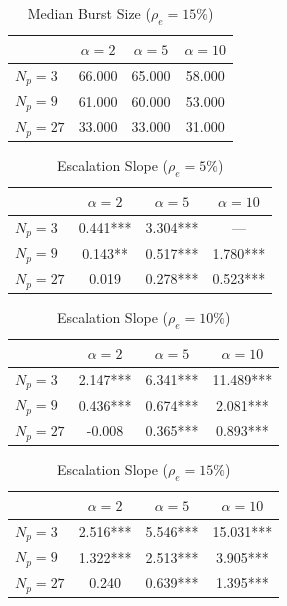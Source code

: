 \begin{table}[htbp]
\centering
\begin{tabular}{lccc}
\toprule
 & $\alpha=2$ & $\alpha=5$ & $\alpha=10$ \\
\midrule
$N_p=3$ & 66.000 & 65.000 & 58.000 \\
$N_p=9$ & 61.000 & 60.000 & 53.000 \\
$N_p=27$ & 33.000 & 33.000 & 31.000 \\
\bottomrule
\end{tabular}
\caption{Median Burst Size ($\rho_e=15\%$)}
\label{tab:exp2_burst_size_median_rho15}
\end{table}


\begin{table}[htbp]
\centering
\begin{tabular}{lccc}
\toprule
 & $\alpha=2$ & $\alpha=5$ & $\alpha=10$ \\
\midrule
$N_p=3$ & 0.441*** & 3.304*** & --- \\
$N_p=9$ & 0.143** & 0.517*** & 1.780*** \\
$N_p=27$ & 0.019 & 0.278*** & 0.523*** \\
\bottomrule
\end{tabular}
\caption{Escalation Slope ($\rho_e=5\%$)}
\label{tab:exp2_escalation_slope_rho5}
\end{table}


\begin{table}[htbp]
\centering
\begin{tabular}{lccc}
\toprule
 & $\alpha=2$ & $\alpha=5$ & $\alpha=10$ \\
\midrule
$N_p=3$ & 2.147*** & 6.341*** & 11.489*** \\
$N_p=9$ & 0.436*** & 0.674*** & 2.081*** \\
$N_p=27$ & -0.008 & 0.365*** & 0.893*** \\
\bottomrule
\end{tabular}
\caption{Escalation Slope ($\rho_e=10\%$)}
\label{tab:exp2_escalation_slope_rho10}
\end{table}


\begin{table}[htbp]
\centering
\begin{tabular}{lccc}
\toprule
 & $\alpha=2$ & $\alpha=5$ & $\alpha=10$ \\
\midrule
$N_p=3$ & 2.516*** & 5.546*** & 15.031*** \\
$N_p=9$ & 1.322*** & 2.513*** & 3.905*** \\
$N_p=27$ & 0.240 & 0.639*** & 1.395*** \\
\bottomrule
\end{tabular}
\caption{Escalation Slope ($\rho_e=15\%$)}
\label{tab:exp2_escalation_slope_rho15}
\end{table}
